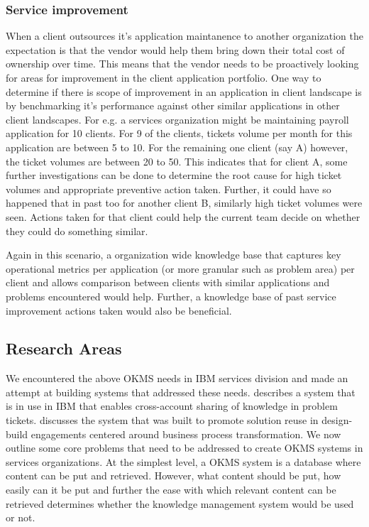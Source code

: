 \subsubsection{Service improvement}

When a client outsources it's application maintanence to another organization the expectation is that the vendor would help them bring down their total cost of ownership over time. This means that the vendor needs to be proactively looking for areas for improvement in the client application portfolio. One way to determine if there is scope of improvement in an application in client landscape is by benchmarking it's performance against other similar applications in other client landscapes. For e.g. a services organization might be maintaining payroll application for 10 clients. For 9 of the clients, tickets volume per month for this application are between 5 to 10. For the remaining one client (say A) however, the ticket volumes are between 20 to 50. This indicates that for client A, some further investigations can be done to determine the root cause for high ticket volumes and appropriate preventive action taken. Further, it could have so happened that in past too for another client B, similarly high ticket volumes were seen. Actions taken for that client could help the current team decide on whether they could do something similar.

Again in this scenario, a organization wide knowledge base that captures key operational metrics per application (or more granular such as problem area) per client and allows comparison between clients with similar applications and problems encountered would help. Further, a knowledge base of past service improvement actions taken would also be beneficial.

\subsection{Research Areas}

We encountered the above OKMS needs in IBM services division and made an attempt at building systems that addressed these needs. \cite{} describes a system that is in use in IBM that enables cross-account sharing of knowledge in problem tickets. \cite{} discusses the system that was built to promote solution reuse in design-build engagements centered around business process transformation. We now outline some core problems that need to be addressed to create OKMS systems in services organizations. At the simplest level, a OKMS system is a database where content can be put and retrieved. However, what content should be put, how easily can it be put and further the ease with which relevant content can be retrieved determines whether the knowledge management system would be used or not. 

